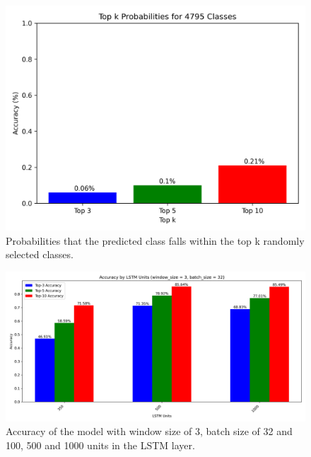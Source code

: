 \begin{figure}[h!]
    \centering
    \includegraphics*[scale=0.8]{images/random_accuracies_4795_classes.png}
    \caption{Probabilities that the predicted class falls within the top k randomly selected classes.}
    \label{fig:random_accuracies_4795_classes}
\end{figure}

\begin{figure}[h!]
    \centering
    \includegraphics[scale=0.4]{images/accuracy_by_lstm_units_window_3_batch_32.png}
    \caption{Accuracy of the model with window size of 3, batch size of 32 and 100, 500 and 1000 units in the LSTM layer.}
    \label{fig:window_size3}
\end{figure}

